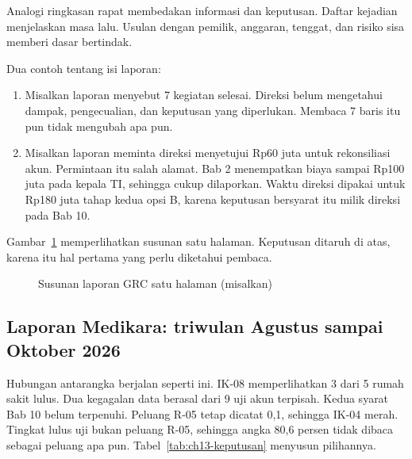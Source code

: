 Analogi ringkasan rapat membedakan informasi dan keputusan. Daftar kejadian menjelaskan masa lalu.
Usulan dengan pemilik, anggaran, tenggat, dan risiko sisa memberi dasar bertindak.

Dua contoh tentang isi laporan:
\begin{enumerate}
  \item Misalkan laporan menyebut 7 kegiatan selesai. Direksi belum mengetahui dampak, pengecualian,
  dan keputusan yang diperlukan. Membaca 7 baris itu pun tidak mengubah apa pun.
  \item Misalkan laporan meminta direksi menyetujui Rp60 juta untuk rekonsiliasi akun. Permintaan
  itu salah alamat. Bab 2 menempatkan biaya sampai Rp100 juta pada kepala TI, sehingga cukup
  dilaporkan. Waktu direksi dipakai untuk Rp180 juta tahap kedua opsi B, karena keputusan bersyarat
  itu milik direksi pada Bab 10.
\end{enumerate}

Gambar~\ref{fig:ch13-laporan} memperlihatkan susunan satu halaman. Keputusan ditaruh di atas, karena
itu hal pertama yang perlu diketahui pembaca.

\begin{figure}[!htb]
  \centering
  
  \caption{Susunan laporan GRC satu halaman (misalkan)}
  \label{fig:ch13-laporan}
\end{figure}

\subsection*{Laporan Medikara: triwulan Agustus sampai Oktober 2026}

Hubungan antarangka berjalan seperti ini. IK-08 memperlihatkan 3 dari 5 rumah sakit lulus. Dua
kegagalan data berasal dari 9 uji akun terpisah. Kedua syarat Bab 10 belum terpenuhi. Peluang R-05
tetap dicatat 0,1, sehingga IK-04 merah. Tingkat lulus uji bukan peluang R-05, sehingga angka 80,6
persen tidak dibaca sebagai peluang apa pun. Tabel~\ref{tab:ch13-keputusan} menyusun pilihannya.

